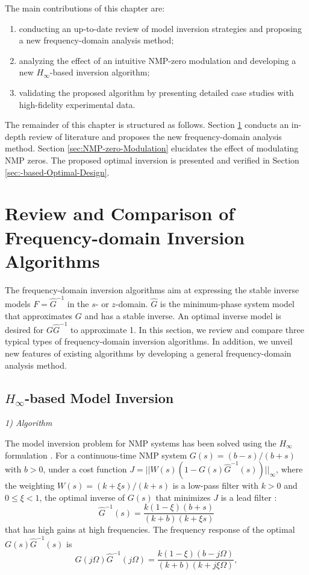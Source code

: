\documentclass [11pt, proquest] {uwthesis}[2020/02/24]
\begin{document}
The main contributions of this chapter are:
\begin{enumerate}
\item conducting an up-to-date review of model inversion strategies and
proposing a new frequency-domain analysis method;
\item analyzing the effect of an intuitive NMP-zero modulation and developing
a new $H_{\infty}$-based inversion algorithm;
\item validating the proposed algorithm by presenting detailed case studies
with high-fidelity experimental data.
\end{enumerate}
The remainder of this chapter is structured as follows. Section \ref{sec:Review-of-Relevant}
conducts an in-depth review of literature and proposes the new frequency-domain
analysis method. Section \ref{sec:NMP-zero-Modulation} elucidates
the effect of modulating NMP zeros. The proposed optimal inversion
is presented and verified in Section \ref{sec:-based-Optimal-Design}.

\section{Review and Comparison of Frequency-domain Inversion Algorithms} \label{sec:Review-of-Relevant}

The frequency-domain inversion algorithms aim at expressing the stable
inverse models $F=\hat{G}^{-1}$ in the $s$- or $z$-domain. $\hat{G}$ is the minimum-phase system model that approximates
$G$ and has a stable inverse. An optimal inverse model is desired
for $G\hat{G}^{-1}$ to approximate 1. In this section, we review
and compare three typical types of frequency-domain inversion algorithms.
In addition, we unveil new features of existing algorithms by developing
a general frequency-domain analysis method.

\subsection{$H_{\infty}$-based Model Inversion} \label{subsec:-based-model-inversion}

\noindent \emph{1) Algorithm}

The model inversion problem for NMP systems has been solved using
the $H_{\infty}$ formulation \cite{francis_h_1984,zheng2017design,zheng2018systematic}.
For a continuous-time NMP system $G(s)=(b-s)/(b+s)$ with $b>0$,
under a cost function $J=||W(s)(1-G(s)\hat{G}^{-1}(s))||_{\infty}$,
where the weighting $W(s)=(k+\xi s)/(k+s)$ is a low-pass filter with
$k>0$ and $0\leq\xi<1$, the optimal inverse of $G(s)$ that minimizes
$J$ is a lead filter \cite{francis_h_1984}:
\begin{equation}
\hat{G}^{-1}(s)=\frac{k(1-\xi)(b+s)}{(k+b)(k+\xi s)}\label{eq:output_stable-1}
\end{equation}
that has high gains at high frequencies. The frequency response of
the optimal $G(s)\hat{G}^{-1}(s)$ is
\begin{equation}
G(j\Omega)\hat{G}^{-1}(j\Omega)=\frac{k(1-\xi)(b-j\Omega)}{(k+b)(k+j\xi\Omega)},\label{eq:GGhatinv}
\end{equation}
\end{document}
